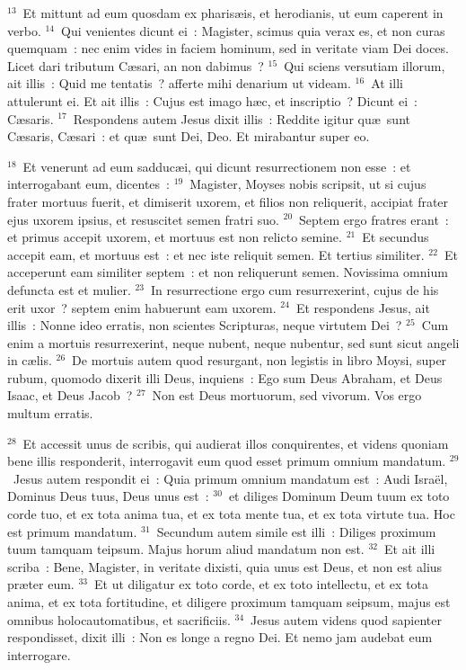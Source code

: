 ${}^{13}$~Et mittunt ad eum quosdam ex pharis\ae is, et herodianis, ut eum caperent in verbo.
${}^{14}$~Qui venientes dicunt ei~: Magister, scimus quia verax es, et non curas quemquam~: nec enim vides in faciem hominum, sed in veritate viam Dei doces. Licet dari tributum C\ae sari, an non dabimus~?
${}^{15}$~Qui sciens versutiam illorum, ait illis~: Quid me tentatis~? afferte mihi denarium ut videam.
${}^{16}$~At illi attulerunt ei. Et ait illis~: Cujus est imago h\ae c, et inscriptio~? Dicunt ei~: C\ae saris.
${}^{17}$~Respondens autem Jesus dixit illis~: Reddite igitur qu\ae\ sunt C\ae saris, C\ae sari~: et qu\ae\ sunt Dei, Deo. Et mirabantur super eo.


${}^{18}$~Et venerunt ad eum sadduc\ae i, qui dicunt resurrectionem non esse~: et interrogabant eum, dicentes~:
${}^{19}$~Magister, Moyses nobis scripsit, ut si cujus frater mortuus fuerit, et dimiserit uxorem, et filios non reliquerit, accipiat frater ejus uxorem ipsius, et resuscitet semen fratri suo.
${}^{20}$~Septem ergo fratres erant~: et primus accepit uxorem, et mortuus est non relicto semine.
${}^{21}$~Et secundus accepit eam, et mortuus est~: et nec iste reliquit semen. Et tertius similiter.
${}^{22}$~Et acceperunt eam similiter septem~: et non reliquerunt semen. Novissima omnium defuncta est et mulier.
${}^{23}$~In resurrectione ergo cum resurrexerint, cujus de his erit uxor~? septem enim habuerunt eam uxorem.
${}^{24}$~Et respondens Jesus, ait illis~: Nonne ideo erratis, non scientes Scripturas, neque virtutem Dei~?
${}^{25}$~Cum enim a mortuis resurrexerint, neque nubent, neque nubentur, sed sunt sicut angeli in c\ae lis.
${}^{26}$~De mortuis autem quod resurgant, non legistis in libro Moysi, super rubum, quomodo dixerit illi Deus, inquiens~: Ego sum Deus Abraham, et Deus Isaac, et Deus Jacob~?
${}^{27}$~Non est Deus mortuorum, sed vivorum. Vos ergo multum erratis.


${}^{28}$~Et accessit unus de scribis, qui audierat illos conquirentes, et videns quoniam bene illis responderit, interrogavit eum quod esset primum omnium mandatum.
${}^{29}$~Jesus autem respondit ei~: Quia primum omnium mandatum est~: Audi Isra\"el, Dominus Deus tuus, Deus unus est~:
${}^{30}$~et diliges Dominum Deum tuum ex toto corde tuo, et ex tota anima tua, et ex tota mente tua, et ex tota virtute tua. Hoc est primum mandatum.
${}^{31}$~Secundum autem simile est illi~: Diliges proximum tuum tamquam teipsum. Majus horum aliud mandatum non est.
${}^{32}$~Et ait illi scriba~: Bene, Magister, in veritate dixisti, quia unus est Deus, et non est alius pr\ae ter eum.
${}^{33}$~Et ut diligatur ex toto corde, et ex toto intellectu, et ex tota anima, et ex tota fortitudine, et diligere proximum tamquam seipsum, majus est omnibus holocautomatibus, et sacrificiis.
${}^{34}$~Jesus autem videns quod sapienter respondisset, dixit illi~: Non es longe a regno Dei. Et nemo jam audebat eum interrogare.


